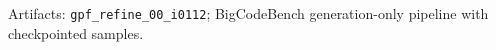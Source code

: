 \documentclass[final]{beamer}
\begin{document}
\begin{frame}[t]
\vfill
\begin{center}
{\large\color{PosterMuted}
Artifacts: \texttt{gpf\_refine\_00\_i0112}; BigCodeBench generation-only pipeline with checkpointed samples.}
\end{center}

\end{frame}
\end{document}
